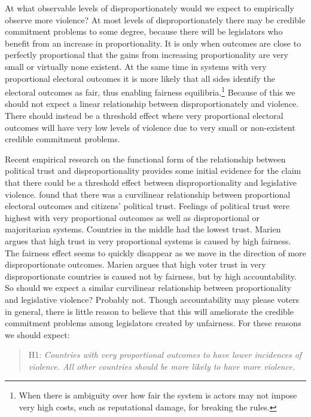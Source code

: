 \documentclass[a4paper]{article}\usepackage[]{graphicx}\usepackage[]{color}
\begin{document}
At what observable levels of disproportionately would we expect to empirically observe more violence? At most levels of disproportionately there may be credible commitment problems to some degree, because there will be legislators who benefit from an increase in proportionality. It is only when outcomes are close to perfectly proportional that the gains from increasing proportionality are very small or virtually none existent. At the same time in systems with very proportional electoral outcomes it is more likely that all sides identify the electoral outcomes as fair, thus enabling fairness equilibria.\footnote{When there is ambiguity over how fair the system is actors may not impose very high costs, such as reputational damage, for breaking the rules.} Because of this we should not expect a linear relationship between disproportionately and violence. There should instead be a threshold effect where very proportional electoral outcomes will have very low levels of violence due to very small or non-existent credible commitment problems.

Recent empirical research on the functional form of the relationship between political trust and disproportionality provides some initial evidence for the claim that there could be a threshold effect between disproportionality and legislative violence. \cite{Marien2011} found that there was a curvilinear relationship between proportional electoral outcomes and citizens' political trust. Feelings of political trust were highest with very proportional outcomes as well as disproportional or majoritarian systems. Countries in the middle had the lowest trust. Marien argues that high trust in very proportional systems is caused by high fairness. The fairness effect seems to quickly disappear as we move in the direction of more disproportionate outcomes. Marien argues that high voter trust in very disproportionate countries is caused not by fairness, but by high accountability. So should we expect a similar curvilinear relationship between proportionality and legislative violence? Probably not. Though accountability may please voters in general, there is little reason to believe that this will ameliorate the credible commitment problems among legislators created by unfairness. For these reasons we should expect:

\begin{quote}
    H1: \emph{Countries with very proportional outcomes to have lower incidences of violence. All other countries should be more likely to have more violence.}
\end{quote}
\end{document}

